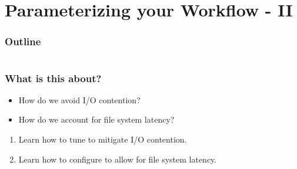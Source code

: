 \section{Parameterizing your Workflow - II}

\begin{frame}
    \frametitle{Outline}
    \begin{columns}[t]
        \begin{column}{.5\textwidth}
            \tableofcontents[sections={1-7},currentsection]
        \end{column}
        \begin{column}{.5\textwidth}
            \tableofcontents[sections={8-15},currentsection]
        \end{column}
    \end{columns}
\end{frame}

\begin{frame}
  \frametitle{What is this about?}
  \begin{question}[Questions]
   	\begin{itemize}
      \item How do we avoid I/O contention?
      \item How do we account for file system latency?
    \end{itemize}
  \end{question}
   \begin{docs}[Objectives]
   	 \begin{enumerate} 
        \item Learn how to tune \Snakemake{} to mitigate I/O contention.
        \item Learn how to configure \Snakemake{} to allow for file system latency.
    \end{enumerate}
  \end{docs}
\end{frame}

